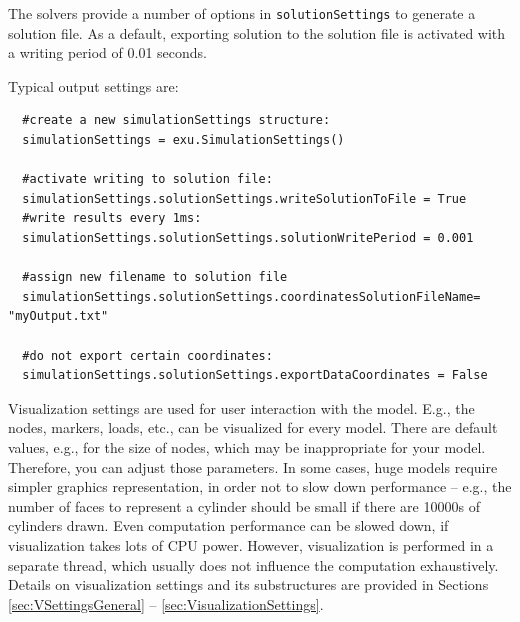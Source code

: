 %
The solvers provide a number of options in \texttt{solutionSettings} to generate a solution file. As a default, exporting solution to the solution file is activated with a writing period of 0.01 seconds.

\noindent Typical output settings are:
\pythonstyle\begin{lstlisting}
  #create a new simulationSettings structure:
  simulationSettings = exu.SimulationSettings()
  
  #activate writing to solution file:
  simulationSettings.solutionSettings.writeSolutionToFile = True
  #write results every 1ms:
  simulationSettings.solutionSettings.solutionWritePeriod = 0.001
  
  #assign new filename to solution file
  simulationSettings.solutionSettings.coordinatesSolutionFileName= "myOutput.txt"

  #do not export certain coordinates:
  simulationSettings.solutionSettings.exportDataCoordinates = False
\end{lstlisting}



%
Visualization settings are used for user interaction with the model. E.g., the nodes, markers, loads, etc., can be visualized for every model. There are default values, e.g., for the size of nodes, which may be inappropriate for your model. Therefore, you can adjust those parameters. In some cases, huge models require simpler graphics representation, in order not to slow down performance -- e.g., the number of faces to represent a cylinder should be small if there are 10000s of cylinders drawn. Even computation performance can be slowed down, if visualization takes lots of CPU power. However, visualization is performed in a separate thread, which usually does not influence the computation exhaustively.
Details on visualization settings and its substructures are provided in Sections \ref{sec:VSettingsGeneral} -- \ref{sec:VisualizationSettings}.

